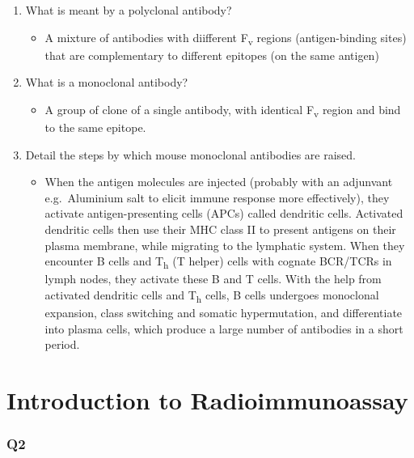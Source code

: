 \documentclass[
]{article}
\providecommand{\tightlist}{%
  \setlength{\itemsep}{0pt}\setlength{\parskip}{0pt}}
\begin{document}
\begin{enumerate}
\def\labelenumi{\roman{enumi}.}
\tightlist
\item
  What is meant by a polyclonal antibody?

  \begin{itemize}
  \tightlist
  \item
    A mixture of antibodies with diifferent F\textsubscript{v} regions (antigen-binding sites) that are complementary to different epitopes (on the same antigen)
  \end{itemize}
\item
  What is a monoclonal antibody?

  \begin{itemize}
  \tightlist
  \item
    A group of clone of a single antibody, with identical F\textsubscript{v} region and bind to the same epitope.
  \end{itemize}
\item
  Detail the steps by which mouse monoclonal antibodies are raised.

  \begin{itemize}
  \tightlist
  \item
    When the antigen molecules are injected (probably with an adjunvant e.g.~Aluminium salt to elicit immune response more effectively), they activate antigen-presenting cells (APCs) called dendritic cells. Activated dendritic cells then use their MHC class II to present antigens on their plasma membrane, while migrating to the lymphatic system. When they encounter B cells and T\textsubscript{h} (T helper) cells with cognate BCR/TCRs in lymph nodes, they activate these B and T cells. With the help from activated dendritic cells and T\textsubscript{h} cells, B cells undergoes monoclonal expansion, class switching and somatic hypermutation, and differentiate into plasma cells, which produce a large number of antibodies in a short period.
  \end{itemize}
\end{enumerate}

\hypertarget{introduction-to-radioimmunoassay}{%
\section{Introduction to Radioimmunoassay}\label{introduction-to-radioimmunoassay}}

\hypertarget{q2}{%
\subsubsection*{Q2}\label{q2}}
\end{document}
